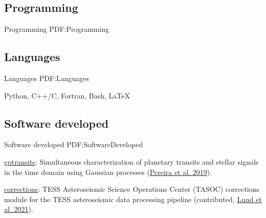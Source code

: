 \documentclass[letterpaper,10pt,oneside]{article}
\begin{document}
\begin{body}









\section
{Programming}
{Programming}
{PDF:Programming}

\subsection
{Languages}
{Languages}
{PDF:Languages}

Python, C++/C, Fortran, Bash, \LaTeX

\BigGap
\subsection
{Software developed}
{Software developed}
{PDF:SoftwareDeveloped}

\BulletItem
\href{https://github.com/Fill4/gptransits}{gptransits}: 
Simultaneous characterization of planetary transits and stellar signals in the time domain using Gaussian processes 
(\href{https://doi.org/10.1093/mnras/stz2405}{Pereira et al. 2019}).

\GapNoBreak
\BulletItem
\href{https://github.com/tasoc/corrections}{corrections}: 
TESS Asteroseismic Science Operations Center (TASOC) corrections module for the TESS asteroseismic data processing pipeline 
(contributed, \href{https://doi.org/10.3847/1538-4365/ac214a}{Lund et al. 2021}).


\end{body}
\end{document}
